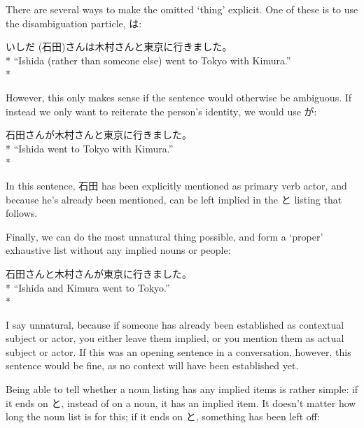 \documentclass[11pt, b5paper, twoside, openright, onecolumn]{book}
\makeatletter
\newcommand*{\rubystack}[2]{{\relscale{0.5}%
  \begin{tabular}[b]{@{}c@{}}%
    {#1}\\%
   {\textscale{2}{#2}}%
  \end{tabular}}%
}
\DeclareRobustCommand*{\ruby}[2]{%
  \mbox{%
    \setlength{\parskip}{0ex}%
    \BeginAccSupp{method=pdfstringdef,ActualText={#1}}%
      \rubystack{\phantom{#2}}{#1}%
      \llap{%
        \rubystack{#2}{\phantom{#1}}%
      }%
    \EndAccSupp{}%
  }%
}
\renewcommand*{\ruby}[2]{#2 (#1)}%
\newenvironment{exampleblock}{
\setlength{\parindent}{0.6in}
\begin{minipage}[t]{\dimexpr\textwidth-\parindent}}
{\end{minipage}}
\makeatother
\begin{document}
There are several ways to make the omitted ‘thing’ explicit. One of these is to use the disambiguation particle‚ は:

\vspace{0.4cm}
\begin{exampleblock}
\ruby{石田}{いしだ}さんは木村さんと東京に行きました。 \\* 
“Ishida (rather than someone else) went to Tokyo with Kimura.” \\* 
\end{exampleblock}
\vspace{0.2cm}

However‚ this only makes sense if the sentence would otherwise be ambiguous. If instead we only want to reiterate the person’s identity‚ we would use が:

\vspace{0.4cm}
\begin{exampleblock}
石田さんが木村さんと東京に行きました。 \\* 
“Ishida went to Tokyo with Kimura.” \\* 
\end{exampleblock}
\vspace{0.2cm}

In this sentence‚ 石田 has been explicitly mentioned as primary verb actor‚ and because he’s already been mentioned‚ can be left implied in the と listing that follows.

Finally‚ we can do the most unnatural thing possible‚ and form a ‘proper’ exhaustive list without any implied nouns or people:

\vspace{0.4cm}
\begin{exampleblock}
石田さんと木村さんが東京に行きました。 \\* 
“Ishida and Kimura went to Tokyo.” \\* 
\end{exampleblock}
\vspace{0.2cm}

I say unnatural‚ because if someone has already been established as contextual subject or actor‚ you either leave them implied‚ or you mention them as actual subject or actor. If this was an opening sentence in a conversation‚ however‚ this sentence would be fine‚ as no context will have been established yet.

Being able to tell whether a noun listing has any implied items is rather simple: if it ends on と‚ instead of on a noun‚ it has an implied item. It doesn’t matter how long the noun list is for this; if it ends on と‚ something has been left off:
\end{document}
